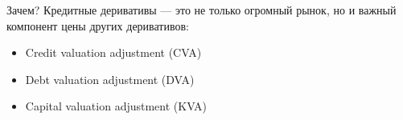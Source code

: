 \documentclass{beamer}
\begin{document}
\begin{frame}{Зачем?}
\justify
Кредитные деривативы --- это не только огромный рынок, но и важный компонент цены других деривативов:
\begin{itemize}
\item Credit valuation adjustment (CVA)
\item Debt valuation adjustment (DVA)
\item Capital valuation adjustment (KVA)
\end{itemize}
\end{frame}
\end{document}
